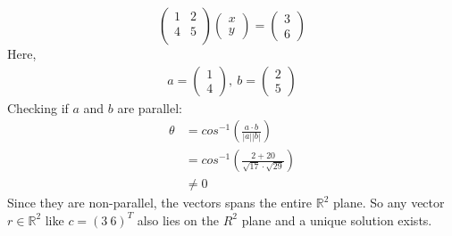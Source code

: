 \documentclass[12pt,letterpaper,fleqn]{article}
\theoremstyle{definition}
\begin{document}
\begin{equation*}
\begin{pmatrix}
1 &2\\
4 &5\\
\end{pmatrix}
\begin{pmatrix}
x\\
y
\end{pmatrix} =
\begin{pmatrix}
3\\
6
\end{pmatrix}
\end{equation*}
Here,
\begin{equation*}
\begin{split}
a = \begin{pmatrix}
1\\
4
\end{pmatrix},~b = \begin{pmatrix}
2\\
5
\end{pmatrix}
\end{split}
\end{equation*}
Checking if $a$ and $b$ are parallel:\\
\begin{equation*}
\begin{split}
\theta &= cos^{-1} \left( \frac{a \cdot b}{|a||b|} \right)\\
&= cos^{-1} \left( \frac{2 + 20}{\sqrt{17} \cdot \sqrt{29}}\right)\\
&\neq 0
\end{split}
\end{equation*}
Since they are non-parallel, the vectors spans the entire $\mathbb{R}^{2}$ plane. So any vector $r \in \mathbb{R}^{2}$ like $c = (3~6)^{T}$ also lies on the $R^{2}$ plane and a unique solution exists.\\
\end{document}
